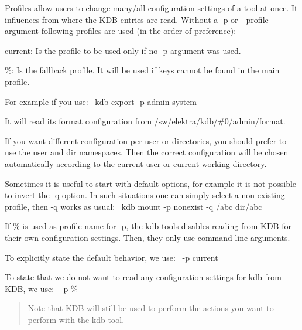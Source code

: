 Profiles allow users to change many/all configuration settings of a tool at once. It influences from where the K\+DB entries are read. Without a {\ttfamily -\/p} or {\ttfamily -\/-\/profile} argument following profiles are used (in the order of preference)\+:


\begin{DoxyItemize}
\item {\ttfamily current}\+: Is the profile to be used only if no {\ttfamily -\/p} argument was used.
\item {\ttfamily \%}\+: Is the fallback profile. It will be used if keys cannot be found in the main profile.
\end{DoxyItemize}

For example if you use\+:~\newline
 {\ttfamily kdb export -\/p admin system}

It will read its format configuration from {\ttfamily /sw/elektra/kdb/\#0/admin/format}.

If you want different configuration per user or directories, you should prefer to use the {\ttfamily user} and {\ttfamily dir} namespaces. Then the correct configuration will be chosen automatically according to the current user or current working directory.

Sometimes it is useful to start with default options, for example it is not possible to invert the {\ttfamily -\/q} option. In such situations one can simply select a non-\/existing profile, then {\ttfamily -\/q} works as usual\+:~\newline
 {\ttfamily kdb mount -\/p nonexist -\/q /abc dir/abc}

If {\ttfamily \%} is used as profile name for {\ttfamily -\/p}, the {\ttfamily kdb} tools disables reading from {\ttfamily K\+DB} for their own configuration settings. Then, they only use command-\/line arguments.

To explicitly state the default behavior, we use\+:~\newline
 {\ttfamily -\/p current}

To state that we do not want to read any configuration settings for {\ttfamily kdb} from K\+DB, we use\+:~\newline
 {\ttfamily -\/p \%}

\begin{quote}
Note that K\+DB will still be used to perform the actions you want to perform with the {\ttfamily kdb} tool. \end{quote}


